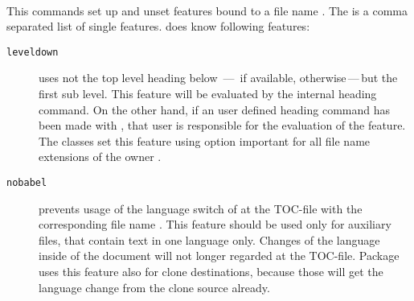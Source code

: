 \begin{Declaration}
  \\
\end{Declaration}
%
%
This commands set up and unset features bound to a file name
. The  is a comma separated list of
single features.  does know following features:
\begin{description}
\item[\texttt{leveldown}] uses not the top level heading below
  \,---\, if available, 
  otherwise\,---\,but the first sub level. This feature will be evaluated by
  the internal heading command. On the other hand, if an user defined heading
  command has been made with , that user is responsible
  for the evaluation of the feature. The \KOMAScript{} classes set this
  feature using option
  important{}%
   for all file name extensions of the
  owner .
\item[\texttt{nobabel}] prevents usage of the language switch of
   at the TOC-file with the corresponding
  file name . This feature should be used only for auxiliary
  files, that contain text in one language only. Changes of the language
  inside of the document will not longer regarded at the TOC-file. Package
   uses
  this feature also for clone destinations, because those will get the
  language change from the clone source already.


\end{description}
